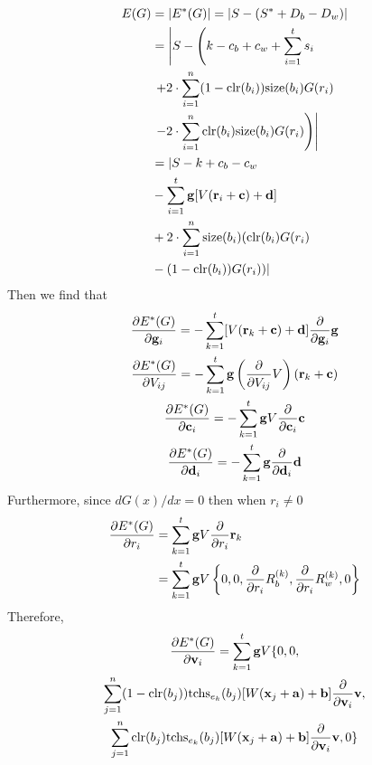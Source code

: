 \documentclass[11pt,letterpaper]{article}
\begin{document}
\begin{align*}
E(G) &= |E^*(G)| = |S - (S^* + D_b - D_w)|\\
  &= \left|S - \left(k - c_b + c_w + \sum_{ i = 1 }^t s_i\right.\right.\\
  &\left.\left.+ 2 \cdot \sum_{ i = 1 }^n (1 - \mbox{clr}{\left( b_i \right)}) \mbox{size}{\left( b_i \right)} G(r_i)\right.\right.\\
  &\left.\left.- 2 \cdot \sum_{ i = 1 }^n \mbox{clr}{\left( b_i \right)} \mbox{size}{\left( b_i \right)} G(r_i)\right)\right|\\
  &= |S - k + c_b - c_w\\
  &- \sum_{ i = 1 }^t \mathbf{ g } [V(\mathbf{ r }_i + \mathbf{ c }) + \mathbf{ d }]\\\
  &+ 2 \cdot \sum_{ i = 1 }^n \mbox{size}{\left( b_i \right)} (\mbox{clr}{\left( b_i \right)}G(r_i)\\
  &- (1 - \mbox{clr}{\left( b_i \right)}) G(r_i))|
\end{align*}
Then we find that
\begin{gather*}
\frac{ \partial E^*(G) }{ \partial \mathbf{ g }_i }
  = -\sum_{ k = 1 }^t [V(\mathbf{ r }_k + \mathbf{ c }) + \mathbf{ d }] \frac{ \partial }{ \partial \mathbf{ g }_i } \mathbf{ g }\\
\frac{ \partial E^*(G) }{ \partial V_{ i j } }
  = -\sum_{ k = 1 }^t \mathbf{ g } \left(\frac{ \partial }{ \partial V_{ i j } } V\right)(\mathbf{ r }_k + \mathbf{ c })\\
\frac{ \partial E^*(G) }{ \partial \mathbf{ c }_i }
  = - \sum_{ k = 1 }^t \mathbf{ g } V \frac{ \partial }{ \partial \mathbf{ c }_i } \mathbf{ c }\\
\frac{ \partial E^*(G) }{ \partial \mathbf{ d }_i } = - \sum_{ k = 1 }^t \mathbf{ g } \frac{ \partial }{ \partial \mathbf{ d }_i } \mathbf{ d }
\end{gather*}
Furthermore, since $d G(x) / d x = 0$ then when $r_i \neq 0$
\begin{align*}
\frac{ \partial E^*(G) }{ \partial r_i }
  &= \sum_{ k = 1 }^t \mathbf{ g } V \frac{ \partial }{ \partial r_i } \mathbf{ r }_k\\
  &= \sum_{ k = 1 }^t \mathbf{ g } V
  \left\{ 0, 0, \frac{ \partial }{ \partial r_i } R_b^{ (k) }, \frac{ \partial }{ \partial r_i } R_w^{ (k) }, 0 \right\}
\end{align*}
Therefore,
\begin{gather*}
\frac{ \partial E^*(G) }{ \partial \mathbf{ v }_i } = \sum_{ k = 1 }^t \mathbf{ g } V \{ 0, 0,\\
  \sum_{ j = 1 }^n (1 - \mbox{clr}{\left( b_j \right)}) \mbox{tchs}_{ e_k }{\left( b_j \right)} [W(\mathbf{ x }_j + \mathbf{ a }) + \mathbf{ b }] \frac{ \partial }{ \partial \mathbf{ v }_i } \mathbf{ v },\\
  \sum_{ j = 1 }^n \mbox{clr}{\left( b_j \right)} \mbox{tchs}_{ e_k }{\left( b_j \right)} [W(\mathbf{ x }_j + \mathbf{ a }) + \mathbf{ b }]  \frac{ \partial }{ \partial \mathbf{ v }_i } \mathbf{ v }, 0 \}
\end{gather*}
\end{document}
